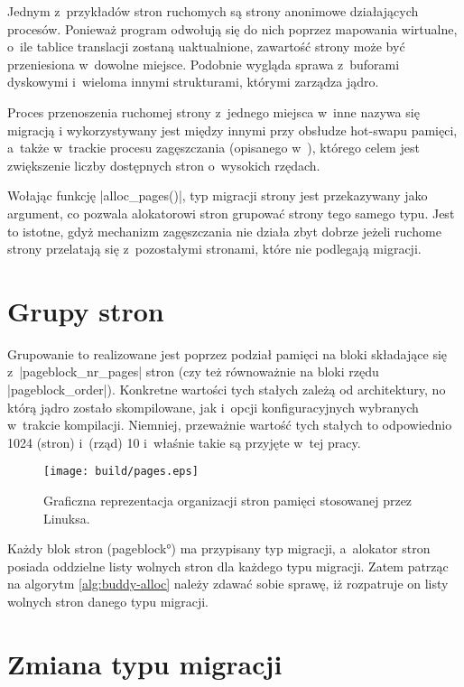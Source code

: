 Jednym z~przykładów stron ruchomych są strony anonimowe działających
procesów.  Ponieważ program odwołują się do nich poprzez mapowania
wirtualne, o~ile tablice translacji zostaną uaktualnione, zawartość
strony może być przeniesiona w~dowolne miejsce.  Podobnie wygląda
sprawa z~buforami dyskowymi i~wieloma innymi strukturami, którymi
zarządza jądro.

Proces przenoszenia ruchomej strony z~jednego miejsca w~inne nazywa
się migracją i wykorzystywany jest między innymi przy obsłudze
hot-swapu pamięci, a~także w~trackie procesu zagęszczania (opisanego
w~\cite{bib:compaction}), którego celem jest zwiększenie liczby
dostępnych stron o~wysokich rzędach.

Wołając funkcję \code|alloc_pages()|, typ migracji strony jest
przekazywany jako argument, co pozwala alokatorowi stron grupować
strony tego samego typu.  Jest to istotne, gdyż mechanizm zagęszczania
nie działa zbyt dobrze jeżeli ruchome strony przelatają się
z~pozostałymi stronami, które nie podlegają migracji.

\section{Grupy stron}

Grupowanie to realizowane jest poprzez podział pamięci na bloki
składające się z~\code|pageblock_nr_pages| stron (czy też
równoważnie na bloki rzędu \code|pageblock_order|).  Konkretne
wartości tych stałych zależą od architektury, no którą jądro zostało
skompilowane, jak i~opcji konfiguracyjnych wybranych w~trakcie
kompilacji.  Niemniej, przeważnie wartość tych stałych to odpowiednio
1024 (stron) i~(rząd) 10 i~właśnie takie są przyjęte w~tej pracy.

\begin{figure}[tbh]
\begin{center}
\texttt{[image: build/pages.eps]}
\end{center}
\caption{Graficzna reprezentacja organizacji stron pamięci stosowanej
  przez Linuksa.}
\end{figure}

Każdy blok stron (\ang{pageblock}) ma przypisany typ migracji,
a~alokator stron posiada oddzielne listy wolnych stron dla każdego
typu migracji.  Zatem patrząc na algorytm \ref{alg:buddy-alloc} należy
zdawać sobie sprawę, iż rozpatruje on listy wolnych stron danego typu
migracji.

\section{Zmiana typu migracji}\label{sec:type-change}

